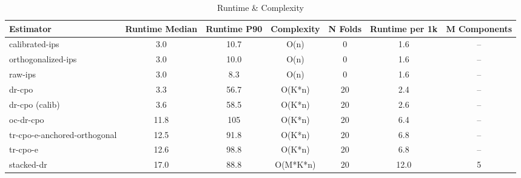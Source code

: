 \begin{table}[htbp]
\centering
\caption{Runtime & Complexity}
\label{tab:A6}
\begin{tabular}{l|cccccc}
\toprule
Estimator & Runtime Median & Runtime P90 & Complexity & N Folds & Runtime per 1k & M Components \\
\midrule
calibrated-ips & 3.0 & 10.7 & O(n) & 0 & 1.6 & -- \\
orthogonalized-ips & 3.0 & 10.0 & O(n) & 0 & 1.6 & -- \\
raw-ips & 3.0 & 8.3 & O(n) & 0 & 1.6 & -- \\
dr-cpo & 3.3 & 56.7 & O(K*n) & 20 & 2.4 & -- \\
dr-cpo (calib) & 3.6 & 58.5 & O(K*n) & 20 & 2.6 & -- \\
oc-dr-cpo & 11.8 & 105 & O(K*n) & 20 & 6.4 & -- \\
tr-cpo-e-anchored-orthogonal & 12.5 & 91.8 & O(K*n) & 20 & 6.8 & -- \\
tr-cpo-e & 12.6 & 98.8 & O(K*n) & 20 & 6.8 & -- \\
stacked-dr & 17.0 & 88.8 & O(M*K*n) & 20 & 12.0 & 5 \\
\bottomrule
\end{tabular}
\end{table}